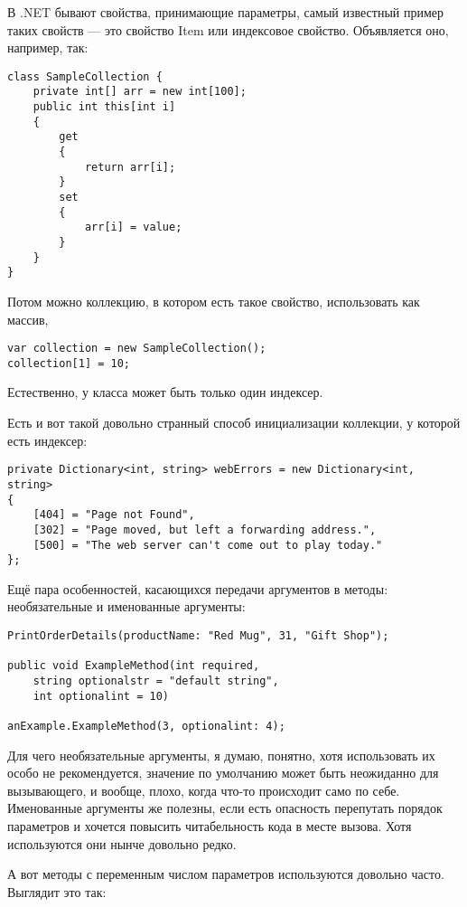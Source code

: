 \documentclass{../../text-style}
\begin{document}
В .NET бывают свойства, принимающие параметры, самый известный пример таких свойств --- это свойство Item или индексовое свойство. Объявляется оно, например, так: 

\begin{verbatim}
class SampleCollection {
    private int[] arr = new int[100];
    public int this[int i]
    {
        get
        {
            return arr[i];
        }
        set
        {
            arr[i] = value;
        }
    }
}
\end{verbatim}

Потом можно коллекцию, в котором есть такое свойство, использовать как массив,

\begin{verbatim}
var collection = new SampleCollection();
collection[1] = 10;
\end{verbatim}

Естественно, у класса может быть только один индексер.

Есть и вот такой довольно странный способ инициализации коллекции, у которой есть индексер:

\begin{verbatim}
private Dictionary<int, string> webErrors = new Dictionary<int, string>
{
    [404] = "Page not Found",
    [302] = "Page moved, but left a forwarding address.",
    [500] = "The web server can't come out to play today."
};
\end{verbatim}

Ещё пара особенностей, касающихся передачи аргументов в методы: необязательные и именованные аргументы:

\begin{verbatim}
PrintOrderDetails(productName: "Red Mug", 31, "Gift Shop");

public void ExampleMethod(int required, 
    string optionalstr = "default string",
    int optionalint = 10)

anExample.ExampleMethod(3, optionalint: 4);
\end{verbatim}

Для чего необязательные аргументы, я думаю, понятно, хотя использовать их особо не рекомендуется, значение по умолчанию может быть неожиданно для вызывающего, и вообще, плохо, когда что-то происходит само по себе. Именованные аргументы же полезны, если есть опасность перепутать порядок параметров и хочется повысить читабельность кода в месте вызова. Хотя используются они нынче довольно редко.

А вот методы с переменным числом параметров используются довольно часто. Выглядит это так:
\end{document}
